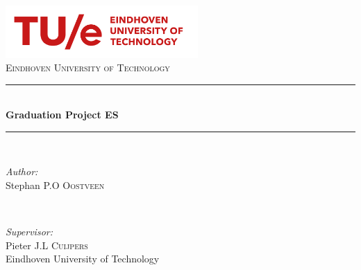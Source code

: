 \begin{titlepage}

\newcommand{\HRule}{\rule{\linewidth}{0.5mm}} %

\center %
 
\includegraphics[width=0.55\textwidth]{images/tuelogonew.png}\\[0.7cm]
\textsc{\LARGE Eindhoven University of Technology}\\[2.5cm] %


\HRule \\[0.5cm]
{ \huge \bfseries Graduation Project ES}\\[0.25cm] %

\HRule \\[2cm]
 

\begin{minipage}[t]{0.5\textwidth}
\begin{flushleft} \large
\emph{Author:}\\
Stephan P.O \textsc{Oostveen}\\
\end{flushleft}
\end{minipage}
~
\begin{minipage}[t]{0.45\textwidth}
\begin{flushright} \large
\emph{Supervisor:} \\ 
Pieter J.L \textsc{Cuijpers}\\  %
Eindhoven University of Technology
\end{flushright}
\end{minipage}\\[4cm]


\end{titlepage}
